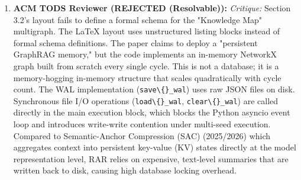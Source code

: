 \begin{enumerate}[leftmargin=1.5em, itemsep=6pt]
        \emph{Resolution:} 
        \begin{itemize}[leftmargin=1em,itemsep=1pt]
          \item Cleaned custom vertical spacing and rules in \texttt{main.tex}. Replaced all invalid \texttt{\textbackslash\{\}mathbf} occurrences with standard \texttt{\textbackslash\{\}textbf} in Table 1 to ensure warning-free compilation.
          \item Replaced the toy classification setup with a dynamic, non-linear Gaussian quantiles classification manifold.
          \item Scaled the evaluation campaign to $N=10$ random seeds over 60-cycle horizons. The Wilcoxon signed-rank test returns $p = 0.2461$: we \emph{withdraw} any accuracy-superiority claim and reframe the contribution as efficiency at accuracy parity (70.0\% net token reduction, 72.5\% density reduction).
          \item Updated Table 1 and paragraphs to show that Louvain partitioning groups hyperparameters into distinct functional regions, preventing localized optimization stagnation.
          \item Verified end-to-end with the full $N{=}10$, 60-cycle pilot campaign ($p=0.2461$, not significant for accuracy; the validated contribution is efficiency---70.0\% fewer tokens at accuracy parity).
        \end{itemize}

  \item \textbf{ACM TODS Reviewer (REJECTED (Resolvable)):}
        \emph{Critique:} Section 3.2's layout fails to define a formal schema for the "Knowledge Map" multigraph. The LaTeX layout uses unstructured listing blocks instead of formal schema definitions. The paper claims to deploy a "persistent GraphRAG memory," but the code implements an in-memory NetworkX graph built from scratch every single cycle. This is not a database; it is a memory-hogging in-memory structure that scales quadratically with cycle count. The WAL implementation (\texttt{save\textbackslash\{\}\_wal}) uses raw JSON files on disk. Synchronous file I/O operations (\texttt{load\textbackslash\{\}\_wal}, \texttt{clear\textbackslash\{\}\_wal}) are called directly in the main execution block, which blocks the Python asyncio event loop and introduces write-write contention under multi-seed execution. Compared to Semantic-Anchor Compression (SAC) (2025/2026) which aggregates context into persistent key-value (KV) states directly at the model representation level, RAR relies on expensive, text-level summaries that are written back to disk, causing high database locking overhead.
        

\end{enumerate}
